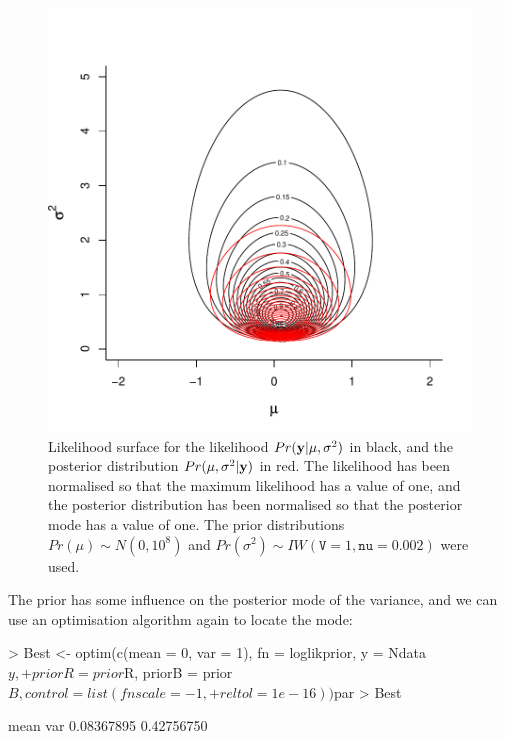 \documentclass{article}
\begin{document}
\begin{figure}[!h]
\begin{center}
\includegraphics{Lecture1-034}
\end{center}
\caption{Likelihood surface for the likelihood $Pr({\bf y}|\mu, \sigma^{2})$ in black, and the posterior distribution $Pr(\mu, \sigma^{2} | {\bf y})$ in red.  The likelihood has been normalised so that the maximum likelihood has a value of one, and the posterior distribution has been normalised so that the posterior mode has a value of one. The prior distributions  $Pr(\mu)\sim N(0, 10^8)$ and  $Pr(\sigma^{2})\sim IW(\texttt{V}=1, \texttt{nu}=0.002)$ were used.}
\label{Psurface-fig}
\end{figure}


The prior has some influence on the posterior mode of the variance, and we can use an optimisation algorithm again to locate the mode:  

\begin{Schunk}
\begin{Sinput}
> Best <- optim(c(mean = 0, var = 1), fn = loglikprior, y = Ndata$y, 
+     priorR = prior$R, priorB = prior$B, control = list(fnscale = -1, 
+         reltol = 1e-16))$par
> Best
\end{Sinput}
\begin{Soutput}
      mean        var 
0.08367895 0.42756750 
\end{Soutput}
\end{Schunk}
\end{document}
